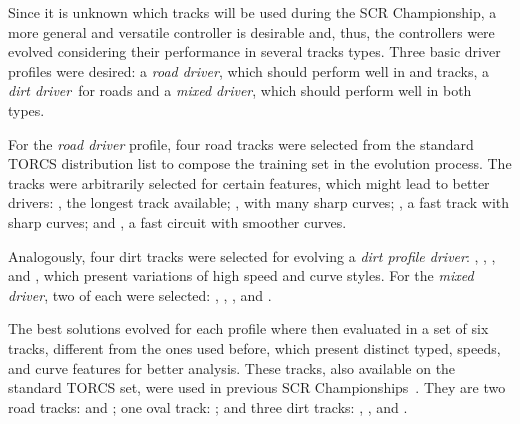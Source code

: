 \newcommand{\profile}[1]{\emph{#1 driver}}%
Since it is unknown which tracks will be used during the SCR Championship, a more general and versatile controller is desirable and, thus, the controllers were evolved considering their performance in several tracks types. Three basic driver profiles were desired: a \profile{road}, which should perform well in  and  tracks, a \profile{dirt}~for  roads and a \profile{mixed}, which should perform well in both types.

For the \profile{road} profile, four road tracks were selected from the standard TORCS distribution list to compose the training set in the evolution process. The tracks were arbitrarily selected for certain features, which might lead to better drivers: , the longest track available; , with many sharp curves; , a fast track with sharp curves; and , a fast circuit with smoother curves.

Analogously, four dirt tracks were selected for evolving a \profile{dirt profile}: , , , and , which present variations of high speed and curve styles. For the \profile{mixed}, two of each were selected: , , , and .


The best solutions evolved for each profile where then evaluated in a set of six tracks, different from the ones used before, which present distinct typed, speeds, and curve features for better analysis. These tracks, also available on the standard TORCS set, were used in previous SCR Championships~\cite{AUTOPIA2009}. They are two road tracks:  and ; one oval track: ; and three dirt tracks: , , and .

